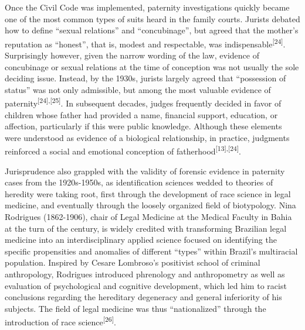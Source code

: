 \documentclass{article}
\begin{document}
Once the Civil Code was implemented, paternity investigations quickly became one
of the most common types of suits heard in the family courts. Jurists debated
how to define “sexual relations” and “concubinage”, but agreed that the mother’s
reputation as “honest”, that is, modest and respectable, was indispensable\textsuperscript{[}\textsuperscript{24}\textsuperscript{]}. Surprisingly however, given the narrow wording of the law, evidence of
concubinage or sexual relations at the time of conception was not usually the
sole deciding issue. Instead, by the 1930s, jurists largely agreed that
“possession of status” was not only admissible, but among the most valuable
evidence of paternity\textsuperscript{[}\textsuperscript{24}\textsuperscript{]}\textsuperscript{,}\textsuperscript{[}\textsuperscript{25}\textsuperscript{]}. In subsequent decades, judges frequently decided in favor of children whose
father had provided a name, financial support, education, or affection,
particularly if this were public knowledge. Although these elements were
understood as evidence of a biological relationship, in practice, judgments
reinforced a social and emotional conception of fatherhood\textsuperscript{[}\textsuperscript{13}\textsuperscript{]}\textsuperscript{,}\textsuperscript{[}\textsuperscript{24}\textsuperscript{]}.

Jurisprudence also grappled with the validity of forensic evidence in paternity
cases from the 1920s-1950s, as identification sciences wedded to theories of
heredity were taking root, first through the development of race science in
legal medicine, and eventually through the loosely organized field of
biotypology. Nina Rodrigues (1862-1906), chair of Legal Medicine at the Medical
Faculty in Bahia at the turn of the century, is widely credited with
transforming Brazilian legal medicine into an interdisciplinary applied science
focused on identifying the specific propensities and anomalies of different
“types” within Brazil’s multiracial population. Inspired by Cesare Lombroso’s
positivist school of criminal anthropology, Rodrigues introduced phrenology and
anthropometry as well as evaluation of psychological and cognitive development,
which led him to racist conclusions regarding the hereditary degeneracy and
general inferiority of his subjects. The field of legal medicine was thus
“nationalized” through the introduction of race science\textsuperscript{[}\textsuperscript{26}\textsuperscript{]}.
\end{document}
